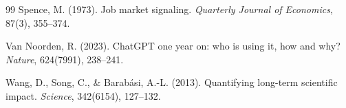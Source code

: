 \documentclass[12pt,a4paper]{article}
\begin{document}
\begin{thebibliography}{99}
Spence, M. (1973).
\newblock Job market signaling.
\newblock \textit{Quarterly Journal of Economics}, 87(3), 355--374.

Van Noorden, R. (2023).
\newblock ChatGPT one year on: who is using it, how and why?
\newblock \textit{Nature}, 624(7991), 238--241.

Wang, D., Song, C., \& Barab\'{a}si, A.-L. (2013).
\newblock Quantifying long-term scientific impact.
\newblock \textit{Science}, 342(6154), 127--132.

\end{thebibliography}

\newpage
\end{document}
